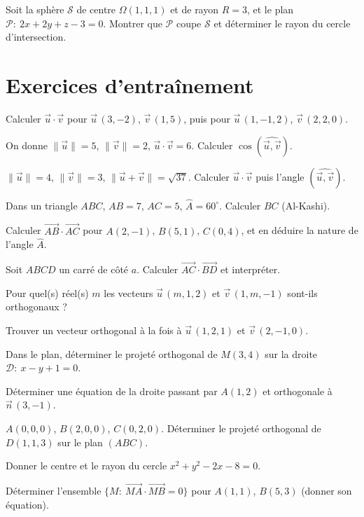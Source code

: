 \exo{} Soit la sphère $\mathcal S$ de centre $\Omega(1,1,1)$ et de rayon $R=3$, et le plan $\mathcal P:\ 2x+2y+z-3=0$. Montrer que $\mathcal P$ coupe $\mathcal S$ et déterminer le rayon du cercle d'intersection.

\section{Exercices d'entraînement}

\exo{} Calculer $\vec u\cdot\vec v$ pour $\vec u\,(3,-2)$, $\vec v\,(1,5)$, puis pour $\vec u\,(1,-1,2)$, $\vec v\,(2,2,0)$.

\exo{} On donne $\|\vec u\|=5$, $\|\vec v\|=2$, $\vec u\cdot\vec v=6$. Calculer $\cos(\widehat{\vec u,\vec v})$.

\exo{} $\|\vec u\|=4$, $\|\vec v\|=3$, $\|\vec u+\vec v\|=\sqrt{37}$. Calculer $\vec u\cdot\vec v$ puis l'angle $(\widehat{\vec u,\vec v})$.

\exo{} Dans un triangle $ABC$, $AB=7$, $AC=5$, $\widehat A=60^\circ$. Calculer $BC$ (Al-Kashi).

\exo{} Calculer $\overrightarrow{AB}\cdot\overrightarrow{AC}$ pour $A(2,-1)$, $B(5,1)$, $C(0,4)$, et en déduire la nature de l'angle $\widehat A$.

\exo{} Soit $ABCD$ un carré de côté $a$. Calculer $\overrightarrow{AC}\cdot\overrightarrow{BD}$ et interpréter.

\exo{} Pour quel(s) réel(s) $m$ les vecteurs $\vec u\,(m,1,2)$ et $\vec v\,(1,m,-1)$ sont-ils orthogonaux ?

\exo{} Trouver un vecteur orthogonal à la fois à $\vec u\,(1,2,1)$ et $\vec v\,(2,-1,0)$.

\exo{} Dans le plan, déterminer le projeté orthogonal de $M(3,4)$ sur la droite $\mathcal D:\ x-y+1=0$.

\exo{} Déterminer une équation de la droite passant par $A(1,2)$ et orthogonale à $\vec n\,(3,-1)$.

\exo{} $A(0,0,0)$, $B(2,0,0)$, $C(0,2,0)$. Déterminer le projeté orthogonal de $D(1,1,3)$ sur le plan $(ABC)$.

\exo{} Donner le centre et le rayon du cercle $x^{2}+y^{2}-2x-8=0$.

\exo{} Déterminer l'ensemble $\{M:\ \overrightarrow{MA}\cdot\overrightarrow{MB}=0\}$ pour $A(1,1)$, $B(5,3)$ (donner son équation).

